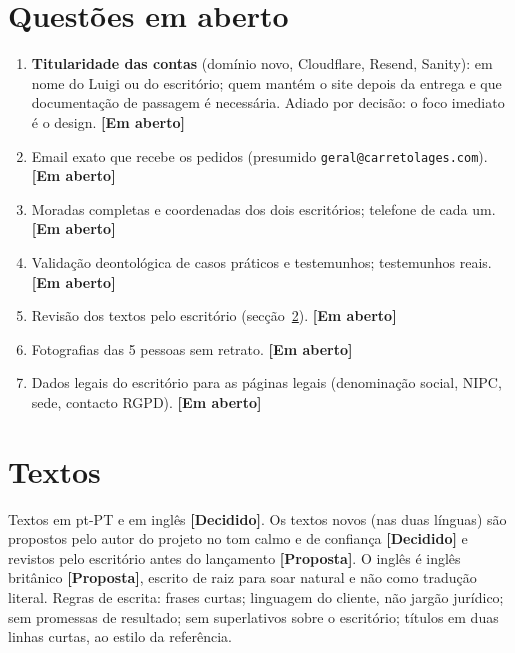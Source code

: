 \documentclass[11pt,a4paper]{article}
\newcommand{\decidido}{\textcolor{verde700}{\textbf{[Decidido]}}}
\newcommand{\proposta}{\textcolor{bronze}{\textbf{[Proposta]}}}
\newcommand{\aberto}{\textcolor{red!60!black}{\textbf{[Em aberto]}}}
\begin{document}
\section{Questões em aberto}
\begin{enumerate}
  \item \textbf{Titularidade das contas} (domínio novo, Cloudflare, Resend, Sanity): em nome do Luigi ou do escritório; quem mantém o site depois da entrega e que documentação de passagem é necessária. Adiado por decisão: o foco imediato é o design. \aberto
  \item Email exato que recebe os pedidos (presumido \texttt{geral@carretolages.com}). \aberto
  \item Moradas completas e coordenadas dos dois escritórios; telefone de cada um. \aberto
  \item Validação deontológica de casos práticos e testemunhos; testemunhos reais. \aberto
  \item Revisão dos textos pelo escritório (secção~\ref{sec:textos}). \aberto
  \item Fotografias das 5 pessoas sem retrato. \aberto
  \item Dados legais do escritório para as páginas legais (denominação social, NIPC, sede, contacto RGPD). \aberto
\end{enumerate}

\section{Textos}\label{sec:textos}
Textos em pt-PT e em inglês \decidido. Os textos novos (nas duas línguas) são propostos pelo autor do projeto no tom calmo e de confiança \decidido{} e revistos pelo escritório antes do lançamento \proposta. O inglês é inglês britânico \proposta, escrito de raiz para soar natural e não como tradução literal. Regras de escrita: frases curtas; linguagem do cliente, não jargão jurídico; sem promessas de resultado; sem superlativos sobre o escritório; títulos em duas linhas curtas, ao estilo da referência.

\end{document}
